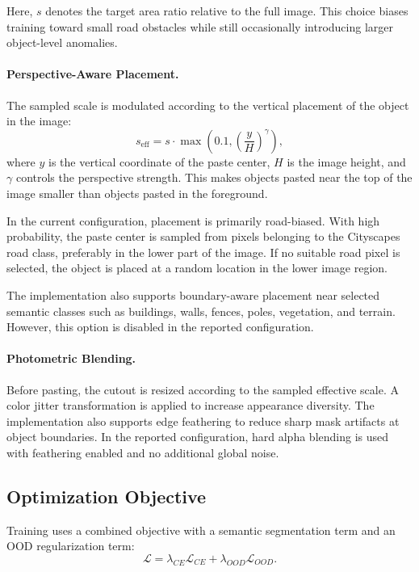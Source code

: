 Here, $s$ denotes the target area ratio relative to the full image. This choice
biases training toward small road obstacles while still occasionally introducing
larger object-level anomalies.

\paragraph{Perspective-Aware Placement.}
The sampled scale is modulated according to the vertical placement of the object
in the image:
\begin{equation}
s_{\text{eff}} =
s \cdot \max\left(0.1, \left(\frac{y}{H}\right)^{\gamma}\right),
\end{equation}
where $y$ is the vertical coordinate of the paste center, $H$ is the image
height, and $\gamma$ controls the perspective strength. This makes objects pasted
near the top of the image smaller than objects pasted in the foreground.

In the current configuration, placement is primarily road-biased. With high
probability, the paste center is sampled from pixels belonging to the Cityscapes
road class, preferably in the lower part of the image. If no suitable road pixel
is selected, the object is placed at a random location in the lower image region.

The implementation also supports boundary-aware placement near selected semantic
classes such as buildings, walls, fences, poles, vegetation, and terrain.
However, this option is disabled in the reported configuration.

\paragraph{Photometric Blending.}
Before pasting, the cutout is resized according to the sampled effective scale.
A color jitter transformation is applied to increase appearance diversity. The
implementation also supports edge feathering to reduce sharp mask artifacts at
object boundaries. In the reported configuration, hard alpha blending is used
with feathering enabled and no additional global noise.

\subsection{Optimization Objective}

Training uses a combined objective with a semantic segmentation term and an OOD
regularization term:
\begin{equation}
\mathcal{L} =
\lambda_{CE} \mathcal{L}_{CE} +
\lambda_{OOD} \mathcal{L}_{OOD}.
\end{equation}


